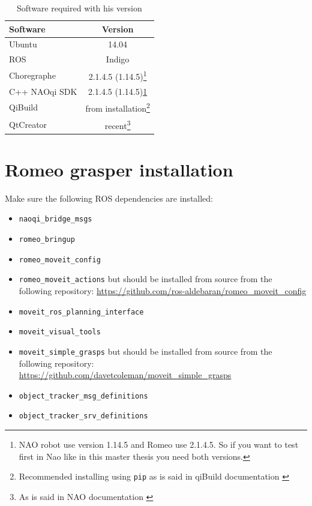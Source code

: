 \documentclass[12pt,a4paper,final,twoside,openright]{report}
\begin{document}
\begin{savenotes}
\begin{table}[h]
\begin{center}
\begin{tabular}{l|c|}
Software & Version\\ \hline
Ubuntu & 14.04\\
ROS & Indigo\\
Choregraphe & 2.1.4.5 (1.14.5)\footnote{\label{fn:nao_version}NAO robot use version 1.14.5 and Romeo use 2.1.4.5. So if you want to test first in Nao like in this master thesis you need both versions.}\\
C++ NAOqi SDK & 2.1.4.5 (1.14.5)\cref{fn:nao_version}\\
QiBuild & from installation\footnote{Recommended installing using \texttt{pip} as is said in qiBuild documentation \cite{AldebaranQiBuild}}\\
QtCreator & recent\footnote{As is said in NAO documentation \cite{AldebaranC++SDK}}\\
\end{tabular}
\caption{Software required with his version\label{tab:soft_req}}
\end{center}
\end{table}
\end{savenotes}

\section{Romeo grasper installation}

Make sure the following ROS dependencies are installed:

\begin{itemize}
\item \texttt{naoqi\_bridge\_msgs}
\item \texttt{romeo\_bringup}
\item \texttt{romeo\_moveit\_config}
\item \texttt{romeo\_moveit\_actions} but should be installed from source from the following repository:
\url{https://github.com/ros-aldebaran/romeo_moveit_config}
\item \texttt{moveit\_ros\_planning\_interface}
\item \texttt{moveit\_visual\_tools}
\item \texttt{moveit\_simple\_grasps} but should be installed from source from the following repository:
\url{https://github.com/davetcoleman/moveit_simple_grasps}
\item \texttt{object\_tracker\_msg\_definitions}
\item \texttt{object\_tracker\_srv\_definitions}
\end{itemize}
\end{document}
